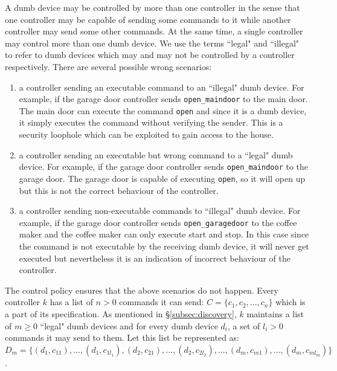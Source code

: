 \documentclass{article}
\begin{document}
A dumb device may be controlled by more than one controller in the sense that one controller may be capable of sending some commands to it while another controller may send some other commands. At the same time, a single controller may control more than one dumb device. We use the terms ``legal" and ``illegal" to refer to dumb devices which may and may not be controlled by a controller respectively.
There are several possible wrong scenarios:
\begin{enumerate}
\item a controller sending an executable command to an ``illegal" dumb device. For example, if the garage door controller sends \texttt{open\_maindoor} to the main door. The main door can execute the command \texttt{open} and since it is a dumb device, it simply executes the command without verifying the sender. This is a security loophole which can be exploited to gain access to the house. 

\item a controller sending an executable but wrong command to a ``legal" dumb device. For example, if the garage door controller sends \texttt{open\_maindoor} to the garage door. The garage door is capable of executing \texttt{open}, so it will open up but this is not the correct behaviour of the controller.

\item a controller sending non-executable commands to ``illegal" dumb device. For example, if the garage door controller sends \texttt{open\_garagedoor} to the coffee maker and the coffee maker can only execute start and stop. In this case since the command is not executable by the receiving dumb device, it  will never get executed but nevertheless it is an indication of incorrect behaviour of the controller.   
\end{enumerate}

The control policy ensures that the above scenarios do not happen.
Every controller $k$ has a list of $n > 0$ commands it can send: $ C = \{c_1, c_2, ..., c_n\}$ which is a part of its specification. As mentioned in \S\ref{subsec:discovery}, $k$ maintains a list of $m \geq 0$ ``legal" dumb devices and for every dumb device $d_i$,  a set of $l_i > 0$ commands it may send to them. Let this list be represented as: \\ $D_{m}= \{(d_{1}, c_{11}), ..., (d_{1}, c_{1l_1}), (d_{2}, c_{21}), ..., (d_{2}, c_{2l_2}), ..., (d_{m}, c_{m1}), ..., (d_m, c_{ml_m})\}$. \\
\end{document}

